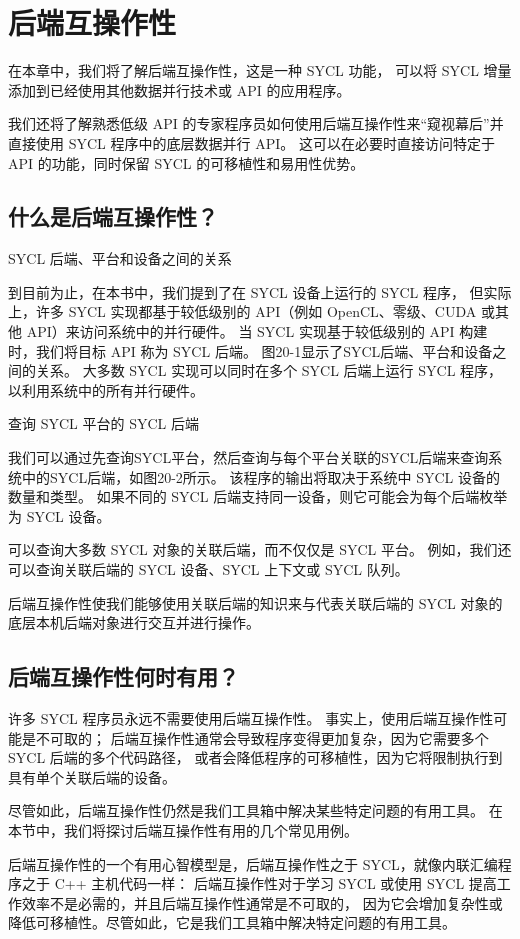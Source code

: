\section{后端互操作性}
在本章中，我们将了解后端互操作性，这是一种 SYCL 功能，
可以将 SYCL 增量添加到已经使用其他数据并行技术或 API 的应用程序。

我们还将了解熟悉低级 API 的专家程序员如何使用后端互操作性来“窥视幕后”并直接使用 SYCL 程序中的底层数据并行 API。 
这可以在必要时直接访问特定于 API 的功能，同时保留 SYCL 的可移植性和易用性优势。

\subsection{什么是后端互操作性？}
{\color{red} SYCL 后端、平台和设备之间的关系}

到目前为止，在本书中，我们提到了在 SYCL 设备上运行的 SYCL 程序，
但实际上，许多 SYCL 实现都基于较低级别的 API（例如 OpenCL、零级、CUDA 或其他 API）来访问系统中的并行硬件。 
当 SYCL 实现基于较低级别的 API 构建时，我们将目标 API 称为 SYCL 后端。 
图20-1显示了SYCL后端、平台和设备之间的关系。 
大多数 SYCL 实现可以同时在多个 SYCL 后端上运行 SYCL 程序，以利用系统中的所有并行硬件。

{\color{red} 查询 SYCL 平台的 SYCL 后端}

我们可以通过先查询SYCL平台，然后查询与每个平台关联的SYCL后端来查询系统中的SYCL后端，如图20-2所示。 
该程序的输出将取决于系统中 SYCL 设备的数量和类型。 
如果不同的 SYCL 后端支持同一设备，则它可能会为每个后端枚举为 SYCL 设备。

可以查询大多数 SYCL 对象的关联后端，而不仅仅是 SYCL 平台。 
例如，我们还可以查询关联后端的 SYCL 设备、SYCL 上下文或 SYCL 队列。

后端互操作性使我们能够使用关联后端的知识来与代表关联后端的 SYCL 对象的底层本机后端对象进行交互并进行操作。

\subsection{后端互操作性何时有用？}
许多 SYCL 程序员永远不需要使用后端互操作性。 事实上，使用后端互操作性可能是不可取的； 
后端互操作性通常会导致程序变得更加复杂，因为它需要多个 SYCL 后端的多个代码路径，
或者会降低程序的可移植性，因为它将限制执行到具有单个关联后端的设备。

尽管如此，后端互操作性仍然是我们工具箱中解决某些特定问题的有用工具。 
在本节中，我们将探讨后端互操作性有用的几个常见用例。

\begin{remark}[后端互操作性就像一个内联汇编程序]
后端互操作性的一个有用心智模型是，后端互操作性之于 SYCL，就像内联汇编程序之于 C++ 主机代码一样：
后端互操作性对于学习 SYCL 或使用 SYCL 提高工作效率不是必需的，并且后端互操作性通常是不可取的，
因为它会增加复杂性或降低可移植性。尽管如此，它是我们工具箱中解决特定问题的有用工具。
\end{remark}

